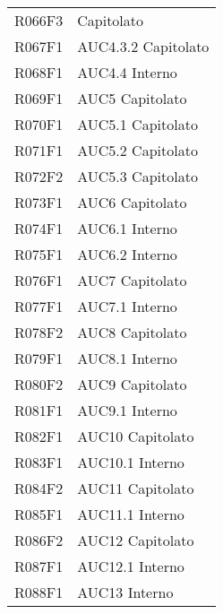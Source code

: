 \documentclass[../analisi-dei-requisiti.tex]{subfiles}
\begin{document}
\begin{center}
\begin{longtable}[H]{ p{3cm} | p{4cm} }
  R066F3                               & Capitolato                    \\
  R067F1                               & AUC4.3.2 Capitolato           \\
  R068F1                               & AUC4.4 Interno                \\
  R069F1                               & AUC5 Capitolato               \\
  R070F1                               & AUC5.1 Capitolato             \\
  R071F1                               & AUC5.2 Capitolato             \\
  R072F2                               & AUC5.3 Capitolato             \\
  R073F1                               & AUC6 Capitolato               \\
  R074F1                               & AUC6.1 Interno                \\
  R075F1                               & AUC6.2 Interno                \\
  R076F1                               & AUC7 Capitolato               \\
  R077F1                               & AUC7.1 Interno                \\
  R078F2                               & AUC8 Capitolato               \\
  R079F1                               & AUC8.1 Interno                \\
  R080F2                               & AUC9 Capitolato               \\
  R081F1                               & AUC9.1 Interno                \\
  R082F1                               & AUC10 Capitolato              \\
  R083F1                               & AUC10.1 Interno               \\
  R084F2                               & AUC11 Capitolato              \\
  R085F1                               & AUC11.1 Interno               \\
  R086F2                               & AUC12 Capitolato              \\
  R087F1                               & AUC12.1 Interno               \\
  R088F1                               & AUC13 Interno                 \\

\end{longtable}
\end{center}
\end{document}
